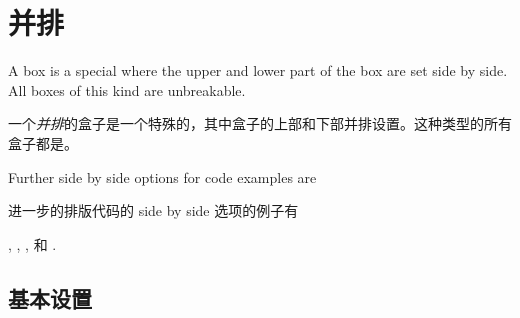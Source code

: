 
\setcounter{section}{5}
\setcounter{subsection}{2}

\section{并排}\label{sec:sidebyside}%
%

A  box is a special  where
the upper and lower part of the box are set side by side.
All boxes of this kind are unbreakable.


一个\emph{并排}的盒子是一个特殊的，其中盒子的上部和下部并排设置。这种类型的所有盒子都是。


\begin{marker}
Further side by side options for code examples are

进一步的排版代码的 side by side 选项的例子有

,
,
, 和
.
\end{marker}

\subsection{基本设置}\label{subsec:sidebyside_basic}




 




 


